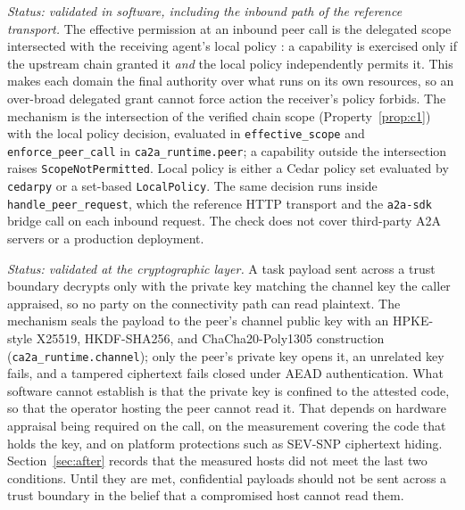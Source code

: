 \begin{property}
\label{prop:c3}
\emph{Status: validated in software, including the inbound path of the reference transport.}
The effective permission at an inbound peer call is the delegated scope intersected with the
receiving agent's local policy \citep{cedar2023}: a capability is exercised only if the upstream
chain granted it \emph{and} the local policy independently permits it. This makes each domain the
final authority over what runs on its own resources, so an over-broad delegated grant cannot force
action the receiver's policy forbids. The mechanism is the intersection of the verified chain
scope (Property~\ref{prop:c1}) with the local policy decision, evaluated in
\texttt{effective\_scope} and \texttt{enforce\_peer\_call} in \texttt{ca2a\_runtime.peer}; a
capability outside the intersection raises \texttt{ScopeNotPermitted}. Local policy is either a
Cedar policy set evaluated by \texttt{cedarpy} or a set-based \texttt{LocalPolicy}. The same
decision runs inside \texttt{handle\_peer\_request}, which the reference HTTP transport and the
\texttt{a2a-sdk} bridge call on each inbound request. The check does not cover third-party A2A
servers or a production deployment.
\end{property}

\begin{property}
\label{prop:c4}
\emph{Status: validated at the cryptographic layer.} A task payload sent across a trust boundary
decrypts only with the private key matching the channel key the caller appraised, so no party on
the connectivity path can read plaintext. The mechanism seals the payload to the peer's channel
public key with an HPKE-style X25519, HKDF-SHA256, and ChaCha20-Poly1305 construction
(\texttt{ca2a\_runtime.channel}); only the peer's private key opens it, an unrelated key fails,
and a tampered ciphertext fails closed under AEAD authentication. What software cannot establish
is that the private key is confined to the attested code, so that the operator hosting the peer
cannot read it. That depends on hardware appraisal being required on the call, on the
measurement covering the code that holds the key, and on platform protections such as SEV-SNP
ciphertext hiding. Section~\ref{sec:after} records that the measured hosts did not meet the last
two conditions. Until they are met, confidential payloads should not be sent across a trust
boundary in the belief that a compromised host cannot read them.
\end{property}

